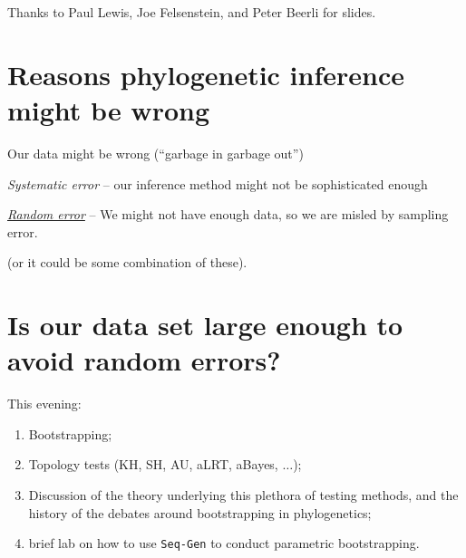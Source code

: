 \documentclass[landscape]{foils}
\begin{document}
\myNewSlide
\huge 
Thanks to Paul Lewis, Joe Felsenstein, and Peter Beerli for slides.

\myNewSlide
\section*{Reasons phylogenetic inference might be wrong}
\Large
\begin{compactenum}
	\item Our data might be wrong (``garbage in garbage out'')
	\item {\em Systematic error} -- our inference method might not be sophisticated enough
	\item \underline{{\em Random error}} -- We might not have enough data, so we are misled by sampling error.
\end{compactenum}

(or it could be some combination of these).

\myNewSlide
\section*{Is our data set large enough to avoid random errors?}

This evening:
\begin{enumerate}
	\item Bootstrapping;
	\item Topology tests (KH, SH, AU, aLRT, aBayes, $\ldots$);
	\item Discussion of the theory underlying this plethora of testing methods, and the history of the debates around bootstrapping in phylogenetics;
	\item brief lab on how to use {\tt Seq-Gen} to conduct parametric bootstrapping.
\end{enumerate}


\myNewSlide
 

\myNewSlide
 

\myNewSlide
 
\end{document}
